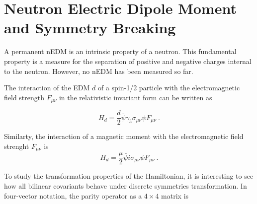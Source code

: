 \section{Neutron Electric Dipole Moment and Symmetry Breaking}
A permanent nEDM is an intrinsic property of a neutron. This
fundamental property is a measure for the separation of positive and
negative charges internal to the neutron. However, no nEDM has been
measured so far.


The interaction of the EDM $d$ of a spin-1/2 particle with the
electromagnetic field strength $F_{\mu \nu}$ in the relativistic
invariant form can be written as

\begin{equation}
\label{eqn:hamiltonianRELelectric}
  H_d = \frac{d}{2} \bar{\psi} \gamma_5 \sigma_{\mu \nu} \psi F_{\mu \nu}~.
\end{equation}

Similarty, the interaction of a magnetic moment with the
electromagnetic field strenght $F_{\mu \nu}$ is
\begin{equation}
\label{eqn:hamiltonianRELmagnetic}
  H_d = \frac{\mu}{2} \bar{\psi} i \sigma_{\mu \nu} \psi F_{\mu \nu}~.
\end{equation}

To study the transformation properties of the Hamiltonian, it is
interesting to see how all bilinear covariants behave under discrete
symmetries transformation.
In four-vector notation, the parity operator as a
$4 \times 4$ matrix is

